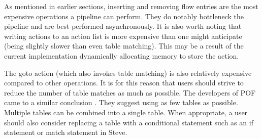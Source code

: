 As mentioned in earlier sections, inserting and removing flow entries are the most expensive operations a pipeline can perform. They do notably bottleneck the pipeline and are best performed asynchronously.
It is also worth noting that writing actions to an action list is more expensive than one might anticipate (being slightly slower than even table matching). This may be a result of the current implementation dynamically allocating memory to store the action.

The goto action (which also invokes table matching) is also relatively expensive compared to other operations. It is for this reason that users should strive to reduce the number of table matches as much as possible. The developers of POF came to a similar conclusion \cite{pof_impl} . They suggest using as few tables as possible. Multiple tables can be combined into a single table. When appropriate, a user should also consider replacing a table with a conditional statement such as an if statement or match statement in Steve.


